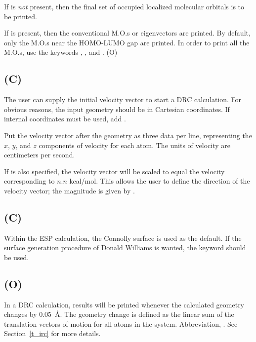         If  is {\em not} present, then
the final set of occupied localized molecular orbitals is to be printed.


If  is  present, then the conventional M.O.s or eigenvectors
are printed.
By default, only the M.O.s near the HOMO-LUMO gap are printed.  In order
to print all the M.O.s, use the keywords , , and
.
(O)



\subsection*{ (C)}
The user can supply the initial  velocity  vector  to  start  a  DRC
calculation.  For obvious reasons, the input  geometry  should  be  in
Cartesian coordinates.  If internal coordinates must be used, add .

        Put the velocity vector after the geometry as three data  per  line,
   representing  the  $x$, $y$, and $z$ components of velocity for each atom.  The
   units of velocity are centimeters per second.

        If  is also specified, the velocity vector will be scaled
   to  equal  the  velocity corresponding to $n.n$ kcal/mol.  This allows the
   user to define the direction of the velocity  vector;  the  magnitude  is
   given by .

\subsection*{ (C)}
        Within the ESP calculation, the Connolly  surface  is  used  as  the
   default.   If  the  surface  generation  procedure  of Donald Williams is
   wanted, the keyword  should be used.



\subsection*{ (O)}
        In  a  DRC  calculation,  results  will  be  printed  whenever   the
   calculated  geometry  changes  by 0.05~\AA.  The geometry change is
   defined as the linear sum of the translation vectors of  motion  for  all
   atoms in the system.  Abbreviation, .
See Section~\ref{t_irc} for more details.



